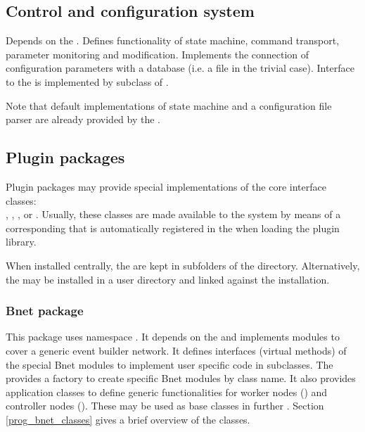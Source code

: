 \subsection{Control and configuration system}
   Depends on the . Defines 
   functionality of state machine, command transport, parameter 
   monitoring and modification. Implements the 
   connection of configuration parameters with a database 
   (i.e. a file in the trivial case). Interface to the  is 
   implemented by subclass of .
   
   Note that default implementations of state machine and a configuration file
   parser are already provided by the .

                
\subsection{Plugin packages}
Plugin packages may provide special implementations of the core interface classes: \\
, , , or
. Usually, these classes are made available to the system by means
of a corresponding  that is automatically registered in the  
when loading the plugin library.

When installed centrally, the  are kept in subfolders of the   directory.
Alternatively, the  may be installed in a user directory and linked against the
 installation.

\subsubsection{Bnet package}
   This package uses namespace . It depends on the  and implements 
   modules to cover a generic event builder network. 
   It defines interfaces (virtual methods) of the special Bnet modules to 
   implement user specific code in subclasses. The  provides a 
   factory to create specific Bnet modules by class name. It also 
   provides application classes to define generic functionalities for 
   worker nodes () and 
   controller nodes (). These may be used as base classes
   in further .
   Section \ref{prog_bnet_classes} gives a brief overview of the
 classes.   
   
